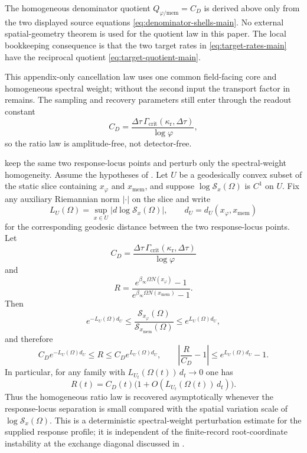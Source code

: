 \begin{remark}
The homogeneous denominator quotient $Q_{\varphi/\mathrm{mem}}=C_D$ is derived
above only from the two displayed source equations
\eqref{eq:denominator-shells-main}. No external spatial-geometry theorem is used
for the quotient law in this paper. The local bookkeeping consequence is that
the two target rates in \eqref{eq:target-rates-main} have the reciprocal
quotient \eqref{eq:target-quotient-main}.
\end{remark}

This appendix-only cancellation law uses one common field-facing core and
homogeneous spectral weight; without the second input the transport factor in
 remains. The sampling and recovery
parameters still enter through the readout constant
\[
C_D=\frac{\Delta\tau\,\Gamma_{\mathrm{crit}}(\kappa_{\mathrm r},\Delta\tau)}{\log\varphi},
\]
so the ratio law is amplitude-free, not detector-free.

\begin{proposition}\label{prop:spectral-stability-main}
\ResponseStandingClause keep the same two response-locus points
and perturb only the spectral-weight homogeneity.
Assume the hypotheses
of . Let $U$ be a geodesically convex
subset of the static slice containing $x_\varphi$ and $x_{\mathrm{mem}}$, and
suppose $\log \mathcal S_x(\Omega)$ is $C^1$ on $U$. Fix any auxiliary
Riemannian norm $|\cdot|$ on the slice and write
\[
L_U(\Omega)=\sup_{x\in U}|d\log \mathcal S_x(\Omega)|,
\qquad
d_U=d_U(x_\varphi,x_{\mathrm{mem}})
\]
for the corresponding geodesic distance between the two response-locus points. Let
\[
C_D=\frac{\Delta\tau\,\Gamma_{\mathrm{crit}}(\kappa_{\mathrm r},\Delta\tau)}{\log\varphi}
\]
and
\[
R=
\frac{e^{\beta_\infty\Omega N(x_{\varphi})}-1}
     {e^{\beta_\infty\Omega N(x_{\mathrm{mem}})}-1}.
\]
Then
\begin{equation}\label{eq:spectral-stability-main}
e^{-L_U(\Omega)d_U}
\le
\frac{\mathcal S_{x_\varphi}(\Omega)}
     {\mathcal S_{x_{\mathrm{mem}}}(\Omega)}
\le
e^{L_U(\Omega)d_U},
\end{equation}
and therefore
\begin{equation}\label{eq:spectral-stability-ratio-main}
C_D e^{-L_U(\Omega)d_U}
\le R\le
C_D e^{L_U(\Omega)d_U},
\qquad
\left|\frac{R}{C_D}-1\right|
\le e^{L_U(\Omega)d_U}-1.
\end{equation}
In particular, for any family with $L_{U_t}(\Omega(t))\,d_t\to0$ one has
\[
R(t)=C_D(t)\bigl(1+O(L_{U_t}(\Omega(t))\,d_t)\bigr).
\]
Thus the homogeneous ratio law is recovered asymptotically whenever the response-locus separation is small compared with the spatial variation scale of $\log\mathcal S_x(\Omega)$.
This is a deterministic spectral-weight perturbation estimate for the supplied
response profile; it is independent of the finite-record root-coordinate
instability at the exchange diagonal discussed in
.
\end{proposition}

